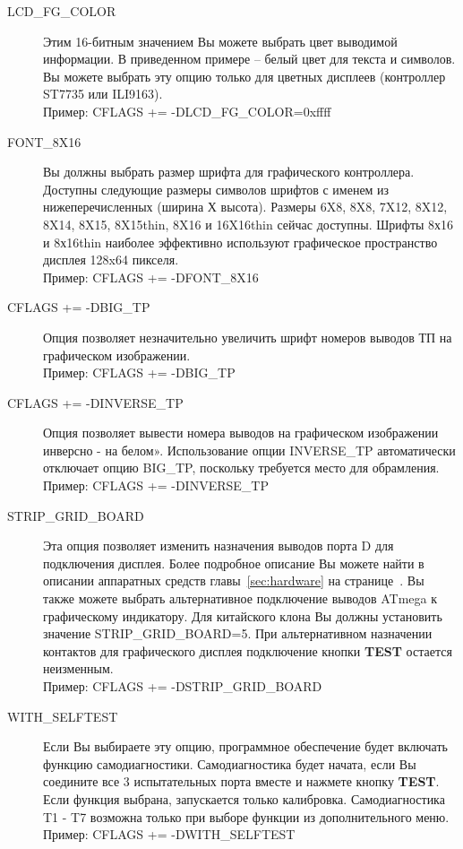 \begin{description}
  \item[LCD\_FG\_COLOR] Этим 16-битным значением Вы можете выбрать цвет выводимой информации.
В приведенном примере -- белый цвет для текста и символов.
Вы можете выбрать эту опцию только для цветных дисплеев (контроллер ST7735 или ILI9163).\\
Пример: CFLAGS += -DLCD\_FG\_COLOR=0xffff

  \item[FONT\_8X16] Вы должны выбрать размер шрифта для графического контроллера.
  Доступны следующие размеры символов шрифтов с именем  из нижеперечисленных (ширина Х высота).
Размеры 6X8, 8X8, 7X12, 8X12, 8X14, 8X15, 8X15thin, 8X16 и 16X16thin сейчас доступны.
Шрифты 8х16 и 8х16thin наиболее эффективно используют графическое пространство дисплея 128x64 пикселя.\\
Пример: CFLAGS += -DFONT\_8X16

  \item[CFLAGS += -DBIG\_TP] Опция позволяет незначительно увеличить шрифт номеров выводов ТП на графическом 
изображении.\\
Пример: CFLAGS += -DBIG\_TP

  \item[CFLAGS += -DINVERSE\_TP] Опция позволяет вывести номера выводов на графическом изображении инверсно -  
на белом». Использование опции INVERSE\_TP автоматически отключает опцию BIG\_TP, поскольку требуется место 
для обрамления.\\
Пример: CFLAGS += -DINVERSE\_TP
  
  \item[STRIP\_GRID\_BOARD] Эта опция позволяет изменить назначения выводов порта D для подключения дисплея.
Более подробное описание Вы можете найти в описании аппаратных средств главы~\ref{sec:hardware} на 
странице~\pageref{sec:hardware}.
Вы также можете выбрать альтернативное подключение выводов ATmega к графическому индикатору.
Для китайского клона  Вы должны установить значение STRIP\_GRID\_BOARD=5.
При альтернативном назначении контактов для графического дисплея подключение кнопки \textbf{ TEST} остается неизменным.\\
Пример: CFLAGS += -DSTRIP\_GRID\_BOARD

  \item[WITH\_SELFTEST] Если Вы выбираете эту опцию, программное обеспечение будет включать функцию самодиагностики. 
  Самодиагностика будет начата, если Вы соедините все 3 испытательных порта вместе  и нажмете кнопку 
\textbf{ TEST}. Если функция выбрана, запускается только калибровка. Самодиагностика T1 - T7 возможна только при выборе 
функции из дополнительного меню.\\
Пример: CFLAGS += -DWITH\_SELFTEST


\end{description}
